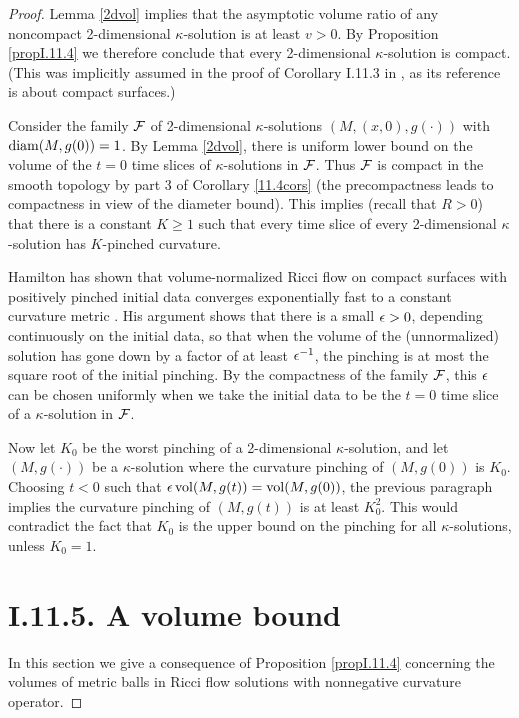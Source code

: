 \begin{proof}

\bigskip
Lemma \ref{2dvol} implies that the asymptotic volume ratio of any
noncompact 2-dimensional $\kappa$-solution is at least $v>0$.
By Proposition \ref{propI.11.4}
we therefore conclude that every 2-dimensional $\kappa$-solution
is compact.  (This was implicitly assumed in the
proof of Corollary I.11.3 in \cite{Perelman}, as its reference
\cite{Hamsurface} is about compact surfaces.)

Consider the family ${\mathcal F}$
of 2-dimensional $\kappa$-solutions $(M,(x,0),g(\cdot))$
with $\operatorname{diam}(M,g(0))=1$.  By Lemma \ref{2dvol}, there is uniform
lower bound on the volume of the $t=0$ time slices of $\kappa$-solutions in
${\mathcal F}$. Thus ${\mathcal F}$  is compact in the smooth topology by part 3 of
Corollary \ref{11.4cors}
(the precompactness leads to compactness in view of the diameter bound).
This implies
(recall that $R > 0$) that there is a constant $K\geq 1$ such that
every time slice of every 2-dimensional $\kappa$-solution has
$K$-pinched curvature.

Hamilton has shown that volume-normalized Ricci
flow on compact surfaces with positively pinched initial data
converges exponentially fast to a constant curvature metric
\cite{Hamsurface}.
His argument shows that there is a small $\epsilon>0$, depending
continuously on the initial data, so that when the volume of the
(unnormalized) solution
has  gone down by a factor of
at least $\epsilon^{-1}$,
the pinching is at most the square
root of the initial pinching.  By the compactness of the family ${\mathcal F}$,
this $\epsilon$ can be chosen
uniformly when we take the initial data to be the $t=0$ time slice
of a  $\kappa$-solution in ${\mathcal F}$.

Now let $K_0$ be the worst pinching of
a 2-dimensional $\kappa$-solution, and let
 $(M,g(\cdot))$ be a $\kappa$-solution where the curvature pinching of
$(M,g(0))$ is $K_0$.  Choosing $t<0$ such that
$\epsilon\operatorname{vol}(M,g(t))=\operatorname{vol}(M,g(0))$,
the previous paragraph implies the curvature pinching of $(M,g(t))$ is at
least $K_0^2$. This would
 contradict the fact that $K_0$ is the upper bound on the
pinching for all $\kappa$-solutions, unless $K_0=1$.



\section{I.11.5. A volume bound}

In this section we give a consequence of Proposition \ref{propI.11.4}
concerning the volumes of metric balls in Ricci flow solutions
with nonnegative curvature operator.

\end{proof}
